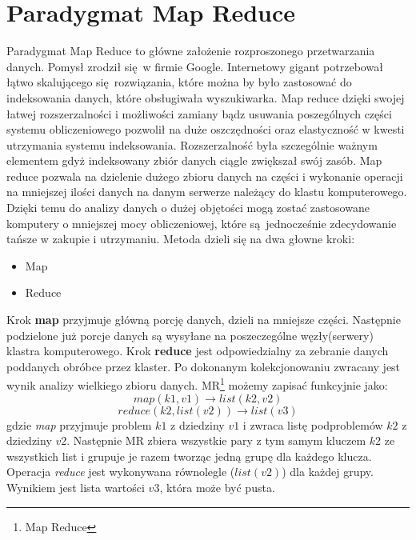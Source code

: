 \section{Paradygmat Map Reduce}
Paradygmat Map Reduce to główne założenie rozproszonego przetwarzania danych. Pomysł zrodził się w firmie Google. Internetowy gigant potrzebował łątwo skalującego się rozwiązania, które można by było zastosować do indeksowania danych, które obsługiwała wyszukiwarka. Map reduce dzięki swojej łatwej rozszerzalności i możliwości zamiany bądz usuwania poszególnych części systemu obliczeniowego pozwolił na duże oszczędności oraz elastyczność w kwesti utrzymania systemu indeksowania. Rozszerzalność była szczególnie ważnym elementem gdyż indeksowany zbiór danych ciągle zwiększał swój zasób.
\newline
Map reduce pozwala na dzielenie dużego zbioru danych na części i wykonanie operacji na mniejszej ilości danych na danym serwerze należący do klastu komputerowego. Dzięki temu do analizy danych o dużej objętości mogą zostać zastosowane komputery o mniejszej mocy obliczeniowej, które są jednocześnie zdecydowanie tańsze w zakupie i utrzymaniu. Metoda dzieli się na dwa głowne kroki:
\begin{itemize}
	\item Map
	\item Reduce 
\end{itemize}
Krok \textbf{map} przyjmuje główną porcję danych, dzieli na mniejsze części. Następnie podzielone już porcje danych są wysyłane na poszeczególne węzły(serwery) klastra komputerowego. Krok \textbf{reduce} jest odpowiedzialny za zebranie danych poddanych obróbce przez klaster. Po dokonanym kolekcjonowaniu zwracany jest wynik analizy wielkiego zbioru danych.\cite{map_reduce_description}
\newline MR\footnote{Map Reduce} możemy zapisać funkcyjnie jako:
\begin{equation}
map(k1,v1) \to list(k2,v2)
\end{equation}
\begin{equation}
reduce(k2, list (v2)) \to list (v3)
\end{equation}
gdzie \textit{map} przyjmuje problem $k1$ z dziedziny $v1$ i zwraca listę podproblemów $k2$ z dziedziny $v2$. Następnie MR zbiera wszystkie pary z tym samym kluczem $k2$ ze wszystkich list i grupuje je razem tworząc jedną grupę dla każdego klucza. Operacja \textit{reduce} jest wykonywana równolegle ($list(v2)$) dla każdej grupy. Wynikiem jest lista wartości $v3$, która może być pusta.\cite{map_reduce_microsoft_article}
